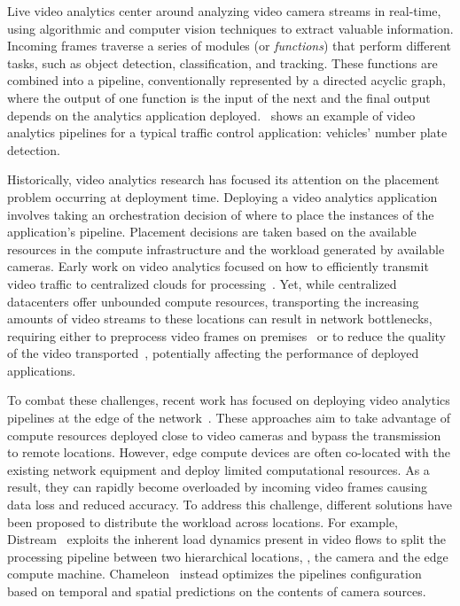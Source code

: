 Live video analytics center around analyzing video camera streams in real-time, using algorithmic and computer vision techniques to extract valuable information. Incoming frames traverse a series of modules (or \textit{functions}) that perform different tasks, such as object detection, classification, and tracking. These functions are combined into a pipeline, conventionally represented by a directed acyclic graph, where the output of one function is the input of the next and the final output depends on the analytics application deployed.~ shows an example of video analytics pipelines for a typical traffic control application: vehicles' number plate detection.

Historically, video analytics research has focused its attention on the placement problem occurring at deployment time. Deploying a video analytics application involves taking an orchestration decision of where to place the instances of the application's pipeline. Placement decisions are taken based on the available resources in the compute infrastructure and the workload generated by available cameras. Early work on video analytics focused on how to efficiently transmit video traffic to centralized clouds for processing~\cite{ao2018sprocket,zhang2017live,fouladi2017encoding}. Yet, while centralized datacenters offer unbounded compute resources, transporting the increasing amounts of video streams to these locations can result in network bottlenecks, requiring either to preprocess video frames on premises~\cite{chen2015glimpse,hung2018videoedge} or to reduce the quality of the video transported~\cite{pakha2018reinventing}, potentially affecting the performance of deployed applications.

To combat these challenges, recent work has focused on deploying video analytics pipelines at the edge of the network~\cite{zeng2020distream,jiang2018chameleon,zhang2019hetero}. These approaches aim to take advantage of compute resources deployed close to video cameras and bypass the transmission to remote locations. However, edge compute devices are often co-located with the existing network equipment and deploy limited computational resources. As a result, they can rapidly become overloaded by incoming video frames causing data loss and reduced accuracy. To address this challenge, different solutions have been proposed to distribute the workload across locations. For example, Distream~\cite{zeng2020distream} exploits the inherent load dynamics present in video flows to split the processing pipeline between two hierarchical locations, \ie, the camera and the edge compute machine. Chameleon~\cite{jiang2018chameleon} instead optimizes the pipelines configuration based on temporal and spatial predictions on the contents of camera sources. 

